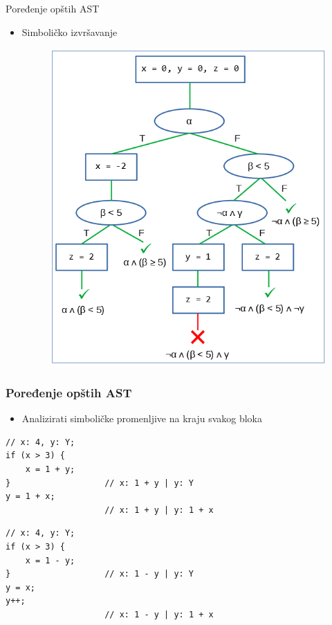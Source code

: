 \documentclass{beamer}
\begin{document}
\begin{frame}{Poređenje opštih AST}
    \begin{itemize}
        \item Simboli\v{c}ko izvr\v{s}avanje 
        \begin{figure}[h!]
            \centering
            \includegraphics[scale=0.45]{images/sym_tree.png}
        \end{figure}
    \end{itemize}
\end{frame}

\begin{frame}[fragile]
    \frametitle{Poređenje opštih AST}
    \begin{itemize}
        \item Analizirati simboli\v{c}ke promenljive na kraju svakog bloka
    \end{itemize}
\begin{lstlisting}[numbers=none]
// x: 4, y: Y;
if (x > 3) {
    x = 1 + y;      
}                   // x: 1 + y | y: Y
y = 1 + x;      
                    // x: 1 + y | y: 1 + x
\end{lstlisting}
\vspace{-10pt}
\begin{lstlisting}[numbers=none]
// x: 4, y: Y;
if (x > 3) { 
    x = 1 - y;       
}                   // x: 1 - y | y: Y
y = x;
y++;
                    // x: 1 - y | y: 1 + x
\end{lstlisting}
\end{frame}
\end{document}
